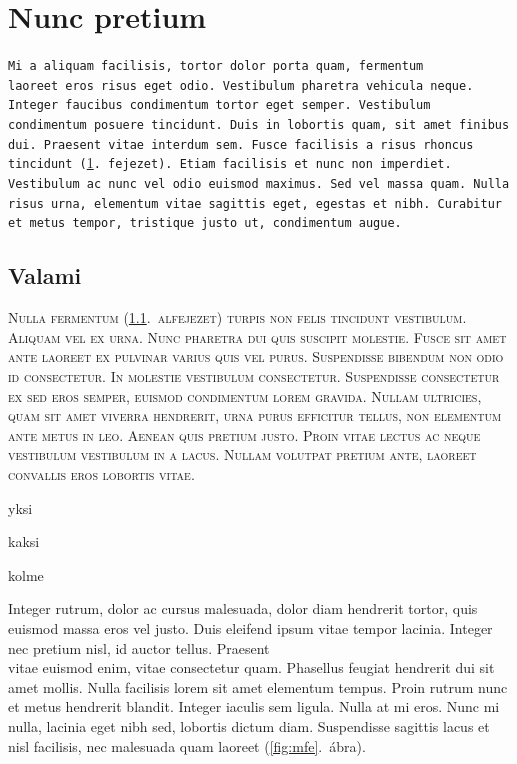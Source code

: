 \documentclass[a4paper,12pt]{article} %
\begin{document}
\section{Nunc pretium}
\label{sec:elso}

\texttt{Mi a aliquam facilisis, tortor dolor porta quam, fermentum laoreet~eros risus eget odio. Vestibulum pharetra vehicula neque. Integer faucibus condimentum tortor eget semper. Vestibulum condimentum posuere tincidunt. Duis in lobortis quam, sit amet finibus dui. Praesent vitae interdum sem. Fusce facilisis a risus rhoncus tincidunt (\ref{sec:elso}.~fejezet). Etiam facilisis et nunc non imperdiet. Vestibulum ac nunc vel odio euismod maximus. Sed vel massa quam. Nulla risus urna, elementum vitae sagittis eget, egestas et nibh. Curabitur et metus tempor, tristique justo ut, condimentum augue.}

\subsection{Valami}
\label{sec:masodik}

\textsc{Nulla fermentum  (\ref{sec:masodik}.~alfejezet) turpis non felis tincidunt vestibulum. Aliquam vel ex urna. Nunc pharetra dui quis suscipit molestie. Fusce sit amet ante laoreet ex pulvinar varius quis vel purus. Suspendisse bibendum non odio id consectetur. In molestie vestibulum consectetur. Suspendisse consectetur ex sed eros semper, euismod condimentum lorem gravida. Nullam ultricies, quam sit amet viverra hendrerit, urna purus efficitur tellus, non elementum ante metus in leo. Aenean quis pretium justo. Proin vitae lectus ac neque vestibulum vestibulum in a lacus. Nullam volutpat pretium ante, laoreet convallis eros lobortis vitae.}

\begin{list}{-}
\item yksi
\item kaksi
\item kolme
\end{list}


Integer rutrum, dolor ac cursus malesuada, dolor diam hendrerit tortor, quis euismod massa eros vel justo. Duis eleifend ipsum vitae tempor lacinia. Integer nec pretium nisl, id auctor tellus. Praesent\\ vitae euismod enim, vitae consectetur quam. Phasellus feugiat hendrerit dui sit amet mollis. Nulla facilisis lorem sit amet elementum tempus. Proin rutrum nunc et metus hendrerit blandit. Integer iaculis sem ligula. Nulla at mi eros. Nunc mi nulla, lacinia eget nibh sed, lobortis dictum diam. Suspendisse sagittis lacus et nisl facilisis, nec malesuada quam laoreet (\ref{fig:mfe}.~ábra).
\end{document}
